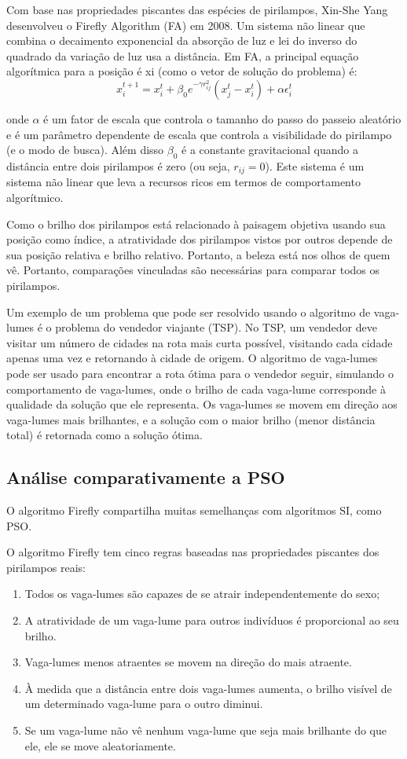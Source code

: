 \documentclass[10pt]{article}
\begin{document}
Com base nas propriedades piscantes das espécies de 
pirilampos, Xin-She Yang desenvolveu o 
Firefly Algorithm (FA) em 2008. Um sistema não linear que 
combina o decaimento exponencial da absorção de luz e lei do 
inverso do quadrado da variação de luz usa a distância. 
Em FA, a principal equação algorítmica para a posição é xi 
(como o vetor de solução do problema) é:
\begin{equation}
  x_i^{t+1} = x_i^t + \beta_0e^{-\gamma r^2_{ij}}(x_j^t - x_i^t) + \alpha \epsilon_i^t
\end{equation}

onde \(\alpha\) é um fator de escala que controla o tamanho 
do passo do passeio aleatório e \gamma é um parâmetro 
dependente de escala que controla a visibilidade do pirilampo
(e o modo de busca). Além disso \(\beta_0\) é a constante 
gravitacional quando a distância entre dois pirilampos é zero
(ou seja, \(r_{ij} = 0\)). Este sistema é um sistema não 
linear que leva a recursos ricos em termos de comportamento 
algorítmico.

Como o brilho dos pirilampos está relacionado à paisagem 
objetiva usando sua posição como índice, a atratividade dos 
pirilampos vistos por outros depende de sua posição relativa
e brilho relativo. Portanto, a beleza está nos olhos de quem vê.
Portanto, comparações vinculadas são necessárias para 
comparar todos os pirilampos.

Um exemplo de um problema que pode ser resolvido usando o 
algoritmo de vaga-lumes é o problema do vendedor viajante (TSP). 
No TSP, um vendedor deve visitar um número de cidades na rota mais
curta possível, visitando cada cidade apenas uma vez e retornando
à cidade de origem. O algoritmo de vaga-lumes pode ser usado 
para encontrar a rota ótima para o vendedor seguir, simulando 
o comportamento de vaga-lumes, onde o brilho de cada vaga-lume 
corresponde à qualidade da solução que ele representa. Os 
vaga-lumes se movem em direção aos vaga-lumes mais brilhantes, 
e a solução com o maior brilho (menor distância total) é 
retornada como a solução ótima.

\newpage
\subsection{Análise comparativamente a PSO}
O algoritmo Firefly compartilha muitas semelhanças com 
algoritmos SI, como PSO.

O algoritmo Firefly tem cinco regras baseadas nas propriedades 
piscantes dos pirilampos reais:
\begin{enumerate}
  \item Todos os vaga-lumes são capazes de se atrair independentemente do sexo; 
  \item A atratividade de um vaga-lume para outros indivíduos é proporcional ao seu brilho. 
  \item Vaga-lumes menos atraentes se movem na direção do mais atraente. 
  \item À medida que a distância entre dois vaga-lumes aumenta, o brilho visível de um determinado vaga-lume para o outro diminui. 
  \item Se um vaga-lume não vê nenhum vaga-lume que seja mais brilhante do que ele, ele se move aleatoriamente. 
\end{enumerate}
\end{document}
